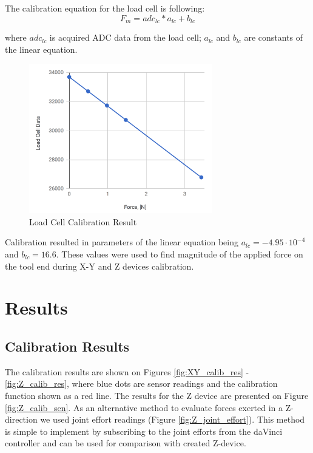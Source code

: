 	The calibration equation for the load cell is following:
\begin{equation}
F_{m} = adc_{lc}*a_{lc} + b_{lc}
\end{equation}

	where $adc_{lc}$ is acquired ADC data from the load cell; $a_{lc}$ and $b_{lc}$ are constants of the linear equation.

\begin{figure}[h]
	\begin{center}
	\includegraphics[width=80mm]{fig/methods/load_cell_calib_data.png}
	\end{center}
	\vspace{-4mm}
	\caption[Load Cell Calibration Result]
	{Load Cell Calibration Result}
	\label{fig:LC_calib_res}
	\vspace{-2mm}
\end{figure}

	Calibration resulted in parameters of the linear equation being  $a_{lc} = -4.95 \cdot 10^{-4}$ and $b_{lc} = 16.6$. These values were used to find magnitude of the applied force on the tool end during X-Y and Z devices calibration.

\section{Results}
\label{sec:res}

\subsection{Calibration Results}
\label{ssec:Cal_Res}

The calibration results are shown on Figures \ref{fig:XY_calib_res} - \ref{fig:Z_calib_res}, where blue dots are sensor readings and the calibration function shown as a red line. The results for the Z device are presented on Figure \ref{fig:Z_calib_sen}. As an alternative method to evaluate forces exerted in a Z-direction we used joint effort readings (Figure \ref{fig:Z_joint_effort}). This method is simple to implement by subscribing to the joint efforts from the daVinci controller and can be used for comparison with created Z-device.


